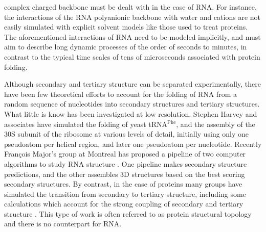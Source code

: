 complex charged backbone must be dealt with in the case of RNA.
For instance,  the interactions of  the RNA polyanionic  backbone with
water  and cations  \cite{klein2004a}  are not  easily simulated  with
explicit   solvent  models   like those used to treat   proteins.  The
aforementioned interactions of RNA  need to be modeled implicitly, and
must aim to describe long dynamic processes of the order of seconds to
minutes,  in  contrast   to  the  typical  time  scales   of  tens  of
microseconds associated with protein folding.

Although   secondary   and  tertiary   structure   can  be   separated
experimentally, there have been few theoretical efforts to account for
the  folding  of  RNA  from  a random  sequence  of  nucleotides  into
secondary structures and tertiary  structures. What little is know has
been  investigated at  low resolution.  Stephen Harvey  and associates
have   simulated   the   folding   of   yeast   tRNA$^{\textrm{Phe}}$,
\cite{malhotra1990}  and  the  assembly  of  the 30S  subunit  of  the
ribosome \cite{stagg2003} at various levels of detail, initially using
only one pseudoatom  per helical region, and later  one pseudoatom per
nucleotide.  Recently  Fran\c{c}ois  Major's  group  at  Montreal  has
proposed a pipeline of two  computer algorithms to study RNA structure
\cite{parisien2008}.   One    pipeline   makes   secondary   structure
predictions, and the  other assembles 3D structures based  on the best
scoring secondary structures.
By contrast,  in the case of  proteins many groups  have simulated the
transition  from  secondary  to  tertiary  structure,  including  some
calculations which  account for the  strong coupling of  secondary and
tertiary  structure   \cite{westhead1999,  gerstein2003,  meiler2003}.
This type of work is  often referred to as protein structural topology
and there is no counterpart for RNA.

